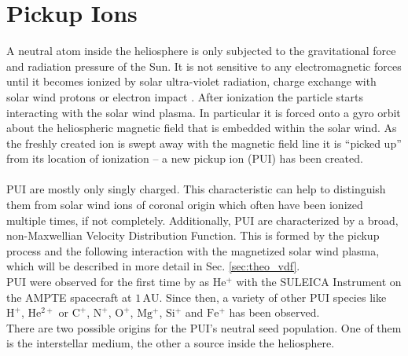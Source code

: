 \chapter{Pickup Ions} %

\label{chapter:theory} %





A neutral atom inside the heliosphere is only subjected to the gravitational force and radiation pressure of the Sun. It is not sensitive to any electromagnetic forces until it becomes ionized by solar ultra-violet radiation, charge exchange with solar wind protons or electron impact \citep{rucinsky}. After ionization the particle starts interacting with the solar wind plasma. In particular it is forced onto a gyro orbit about the heliospheric magnetic field that is embedded within the solar wind. As the freshly created ion is swept away with the magnetic field line it is ``picked up'' from its location of ionization -- a new pickup ion (PUI) has been created.
\\ \\
PUI are mostly only singly charged. This characteristic can help to distinguish them from solar wind ions of coronal origin which often have been ionized multiple times, if not completely. Additionally, PUI are characterized by a broad, non-Maxwellian Velocity Distribution Function. This is formed by the pickup process and the following interaction with the magnetized solar wind plasma, which will be described in more detail in Sec. \ref{sec:theo_vdf}.\\
PUI were observed for the first time by \citet{moebius_nature_85} as $\mathrm{He^{+}}$ with the SULEICA Instrument on the AMPTE spacecraft at $1\,\mathrm{AU}$. Since then, a variety of other PUI species like $\mathrm{H^{+}}$, $\mathrm{He^{2+}}$ or $\mathrm{C^{+}}$, $\mathrm{N^{+}}$, $\mathrm{O^{+}}$, $\mathrm{Mg^{+}}$, $\mathrm{Si^{+}}$ and $\mathrm{Fe^{+}}$ has been observed.\\
There are two possible origins for the PUI's neutral seed population. One of them is the interstellar medium, the other a source inside the heliosphere.

